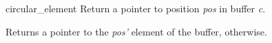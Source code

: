 \begin{DoxyDocu}{circular\_element}
\label{circular_8h_a98e50d6e1bf6d1dd5f6f9b5bf3920aaf_a98e50d6e1bf6d1dd5f6f9b5bf3920aaf}
Return a pointer to position {\itshape pos} in buffer {\itshape c}.

\begin{DoxyReturn}{Returns}
a pointer to the {\itshape pos'} element of the buffer,  otherwise.
\end{DoxyReturn}


\end{DoxyDocu}
